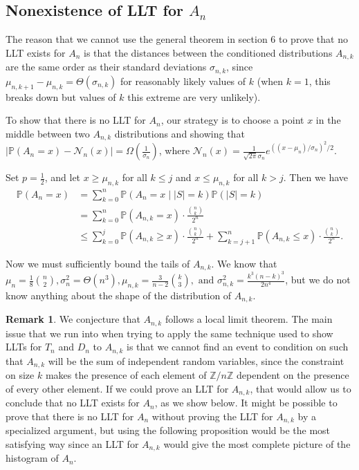 \documentclass[12pt]{article} %
\newcommand{\abs}[1]{\left\lvert#1\right\rvert}
\renewcommand{\P}{\mathbb{P}}
\newcommand{\Z}{\mathbb{Z}}
\theoremstyle{definition}
\theoremstyle{definition}
\newtheorem{remark}[thm]{Remark}
\begin{document}
\subsection{Nonexistence of LLT for $A_n$}
The reason that we cannot use the general theorem in section 6 to prove that no LLT exists for $A_n$ is that the distances between the conditioned distributions $A_{n,k}$ are the same order as their standard deviations $\sigma_{n,k}$, since $\mu_{n,k+1} - \mu_{n,k} = \Theta(\sigma_{n,k})$ for reasonably likely values of $k$ (when $k=1$, this breaks down but values of $k$ this extreme are very unlikely).

To show that there is no LLT for $A_n$, our strategy is to choose a point $x$ in the middle between two $A_{n,k}$ distributions and showing that $\abs{\P(A_n = x) - \mathcal{N}_n(x)} = \Omega(\frac{1}{\sigma_n})$, where $\mathcal{N}_n(x) = \frac{1}{\sqrt{2\pi}\sigma_n} e^{((x-\mu_n)/\sigma_n)^{2}/2}$. 

Set $p = \frac{1}{2}$, and let $x \geq \mu_{n,k}$ for all $k \leq j$ and $x \leq \mu_{n,k}$ for all $k>j$. Then we have
\begin{align*}
\P(A_n = x) &= \sum_{k = 0}^n \P(A_n = x \mid |S| = k)\P(|S| = k)\\
&= \sum_{k = 0}^n \P(A_{n,k} = x) \cdot \frac{{n\choose k}}{2^n} \\
&\leq \sum_{k = 0}^j \P(A_{n,k} \geq x) \cdot \frac{{n\choose k}}{2^n} + \sum_{k = j+1}^n \P(A_{n,k} \leq x) \cdot \frac{{n\choose k}}{2^n}.
\end{align*}

Now we must sufficiently bound the tails of $A_{n,k}$. We know that $\mu_{n} = \frac{1}{8}{n\choose 2}, \sigma_{n}^2 = \Theta(n^3), \mu_{n,k} = \frac{3}{n-2} {k\choose 3}, \text{ and } \sigma_{n,k}^2 = \frac{k^3(n-k)^3}{2n^4}$, but we do not know anything about the shape of the distribution of $A_{n,k}$. 

\begin{remark}
We conjecture that $A_{n,k}$ follows a local limit theorem. The main issue that we run into when trying to apply the same technique used to show LLTs for $T_n$ and $D_n$ to $A_{n,k}$ is that we cannot find an event to condition on such that $A_{n,k}$ will be the sum of independent random variables, since the constraint on size $k$ makes the presence of each element of $\Z/n\Z$ dependent on the presence of every other element. If we could prove an LLT for $A_{n,k}$, that would allow us to conclude that no LLT exists for $A_n$, as we show below. It might be possible to prove that there is no LLT for $A_n$ without proving the LLT for $A_{n,k}$ by a specialized argument, but using the following proposition would be the most satisfying way since an LLT for $A_{n,k}$ would give the most complete picture of the histogram of $A_n$.
\end{remark}
\end{document}
